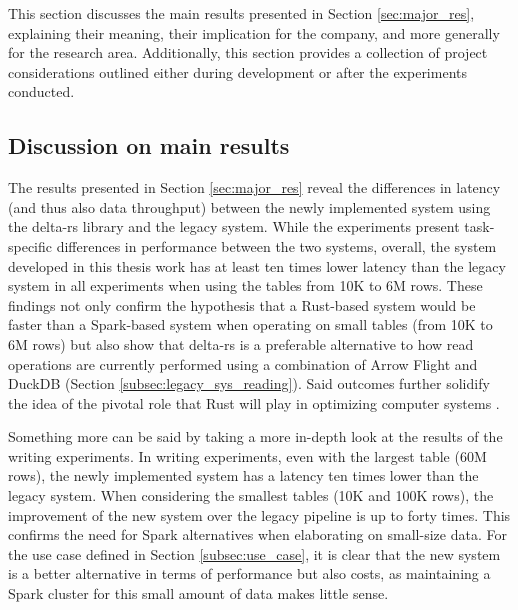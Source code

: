 This section discusses the main results presented in Section \ref{sec:major_res}, explaining their meaning, their implication for the company, and more generally for the research area. Additionally, this section provides a collection of project considerations outlined either during development or after the experiments conducted.

\subsection{Discussion on main results}

The results presented in Section \ref{sec:major_res} reveal the differences in latency (and thus also data throughput) between the newly implemented system using the delta-rs library and the legacy system. While the experiments present task-specific differences in performance between the two systems, overall, the system developed in this thesis work has at least ten times lower latency than the legacy system in all experiments when using the tables from 10K to 6M rows. These findings not only confirm the hypothesis that a Rust-based system would be faster than a Spark-based system when operating on small tables (from 10K to 6M rows) but also show that delta-rs is a preferable alternative to how read operations are currently performed using a combination of Arrow Flight and DuckDB (Section \ref{subsec:legacy_sys_reading}). Said outcomes further solidify the idea of the pivotal role that Rust will play in optimizing computer systems \cite{Balasub2017}.

Something more can be said by taking a more in-depth look at the results of the writing experiments. In writing experiments, even with the largest table (60M rows), the newly implemented system has a latency ten times lower than the legacy system. When considering the smallest tables (10K and 100K rows), the improvement of the new system over the legacy pipeline is up to forty times. This confirms the need for Spark alternatives when elaborating on small-size data. For the use case defined in Section \ref{subsec:use_case}, it is clear that the new system is a better alternative in terms of performance but also costs, as maintaining a Spark cluster for this small amount of data makes little sense. 

